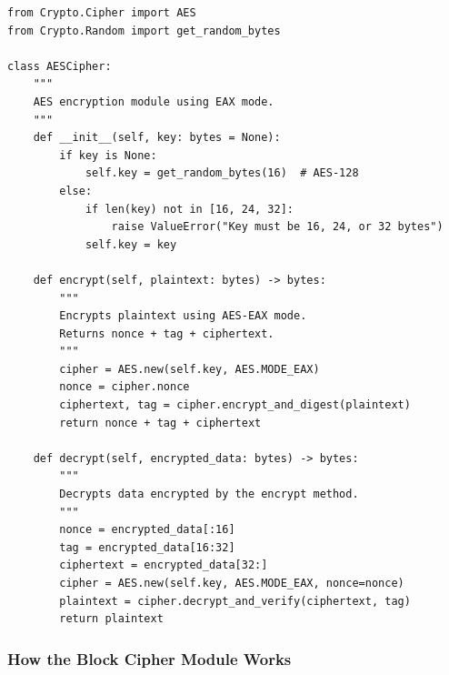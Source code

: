 \documentclass[12pt,a4paper]{article}
\begin{document}
\begin{lstlisting}[caption={AES Block Cipher Module – \texttt{block\_cipher.py}}]
from Crypto.Cipher import AES
from Crypto.Random import get_random_bytes

class AESCipher:
    """
    AES encryption module using EAX mode.
    """
    def __init__(self, key: bytes = None):
        if key is None:
            self.key = get_random_bytes(16)  # AES-128
        else:
            if len(key) not in [16, 24, 32]:
                raise ValueError("Key must be 16, 24, or 32 bytes")
            self.key = key

    def encrypt(self, plaintext: bytes) -> bytes:
        """
        Encrypts plaintext using AES-EAX mode.
        Returns nonce + tag + ciphertext.
        """
        cipher = AES.new(self.key, AES.MODE_EAX)
        nonce = cipher.nonce
        ciphertext, tag = cipher.encrypt_and_digest(plaintext)
        return nonce + tag + ciphertext

    def decrypt(self, encrypted_data: bytes) -> bytes:
        """
        Decrypts data encrypted by the encrypt method.
        """
        nonce = encrypted_data[:16]
        tag = encrypted_data[16:32]
        ciphertext = encrypted_data[32:]
        cipher = AES.new(self.key, AES.MODE_EAX, nonce=nonce)
        plaintext = cipher.decrypt_and_verify(ciphertext, tag)
        return plaintext
\end{lstlisting}

\subsubsection{How the Block Cipher Module Works}
\end{document}
